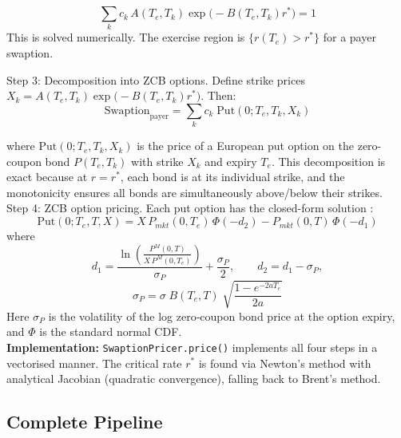     \begin{equation}
        \sum_k c_k \, A(T_e,T_k) \exp\!\bigl(-B(T_e,T_k) r^*\bigr) = 1
    \end{equation}
    This is solved numerically. The exercise region is $\{r(T_e) > r^*\}$ for a payer swaption.

    \noindent
    Step 3: Decomposition into ZCB options. Define strike prices $X_k = A(T_e,T_k) \exp\!\bigl(-B(T_e,T_k) r^*\bigr)$. Then:
    \begin{equation}
        \text{Swaption}_{\text{payer}} = \sum_k c_k \; \text{Put}(0; T_e, T_k, X_k)
    \end{equation}

    \noindent
    where $\text{Put}(0; T_e, T_k, X_k)$ is the price of a European put option on the zero-coupon bond $P(T_e, T_k)$ with strike $X_k$ and expiry $T_e$. This decomposition is exact because at $r = r^*$, each bond is at its individual strike, and the monotonicity ensures all bonds are simultaneously above/below their strikes.\\

    \noindent
    Step 4: ZCB option pricing. Each put option has the closed-form solution \citep{hull1994numerical}:
    \begin{equation}
        \text{Put}(0; T_e, T, X) = X \, P_{mkt}(0,T_e) \, \Phi(-d_2) - P_{mkt}(0,T) \, \Phi(-d_1)
    \end{equation}
    where
    \begin{equation}
            d_1 = \frac{\ln\!\left(\displaystyle\frac{P^M(0,T)}{X\,P^M(0,T_e)}\right)}{\sigma_P} + \frac{\sigma_P}{2}, \qquad
    d_2 = d_1 - \sigma_P,
    \end{equation}
    \begin{equation}
        \sigma_P = \sigma \; B(T_e,T) \; \sqrt{\frac{1 - e^{-2a T_e}}{2a}}
    \end{equation}
    Here $\sigma_P$ is the volatility of the log zero‑coupon bond price at the option expiry, and $\Phi$ is the standard normal CDF.\\

    \noindent
    \textbf{Implementation:} \texttt{SwaptionPricer.price()} implements all four steps in a vectorised manner. The critical rate $r^*$ is found via Newton's method with analytical Jacobian (quadratic convergence), falling back to Brent's method.
    
    \subsection*{Complete Pipeline}
    
